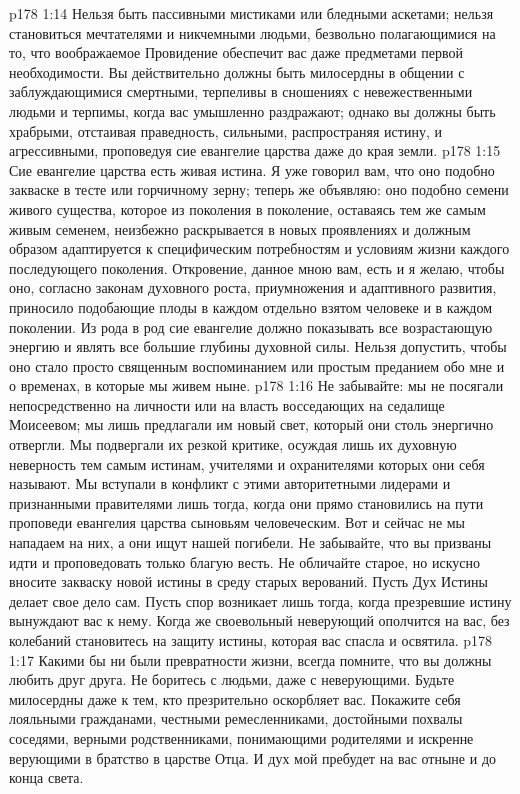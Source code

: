 \vs p178 1:14 Нельзя быть пассивными мистиками или бледными аскетами; нельзя становиться мечтателями и никчемными людьми, безвольно полагающимися на то, что воображаемое Провидение обеспечит вас даже предметами первой необходимости. Вы действительно должны быть милосердны в общении с заблуждающимися смертными, терпеливы в сношениях с невежественными людьми и терпимы, когда вас умышленно раздражают; однако вы должны быть храбрыми, отстаивая праведность, сильными, распространяя истину, и агрессивными, проповедуя сие евангелие царства даже до края земли.
\vs p178 1:15 Сие евангелие царства есть живая истина. Я уже говорил вам, что оно подобно закваске в тесте или горчичному зерну; теперь же объявляю: оно подобно семени живого существа, которое из поколения в поколение, оставаясь тем же самым живым семенем, неизбежно раскрывается в новых проявлениях и должным образом адаптируется к специфическим потребностям и условиям жизни каждого последующего поколения. Откровение, данное мною вам, есть  и я желаю, чтобы оно, согласно законам духовного роста, приумножения и адаптивного развития, приносило подобающие плоды в каждом отдельно взятом человеке и в каждом поколении. Из рода в род сие евангелие должно показывать все возрастающую энергию и являть все большие глубины духовной силы. Нельзя допустить, чтобы оно стало просто священным воспоминанием или простым преданием обо мне и о временах, в которые мы живем ныне.
\vs p178 1:16 Не забывайте: мы не посягали непосредственно на личности или на власть восседающих на седалище Моисеевом; мы лишь предлагали им новый свет, который они столь энергично отвергли. Мы подвергали их резкой критике, осуждая лишь их духовную неверность тем самым истинам, учителями и охранителями которых они себя называют. Мы вступали в конфликт с этими авторитетными лидерами и признанными правителями лишь тогда, когда они прямо становились на пути проповеди евангелия царства сыновьям человеческим. Вот и сейчас не мы нападаем на них, а они ищут нашей погибели. Не забывайте, что вы призваны идти и проповедовать только благую весть. Не обличайте старое, но искусно вносите закваску новой истины в среду старых верований. Пусть Дух Истины делает свое дело сам. Пусть спор возникает лишь тогда, когда презревшие истину вынуждают вас к нему. Когда же своевольный неверующий ополчится на вас, без колебаний становитесь на защиту истины, которая вас спасла и освятила.
\vs p178 1:17 Какими бы ни были превратности жизни, всегда помните, что вы должны любить друг друга. Не боритесь с людьми, даже с неверующими. Будьте милосердны даже к тем, кто презрительно оскорбляет вас. Покажите себя лояльными гражданами, честными ремесленниками, достойными похвалы соседями, верными родственниками, понимающими родителями и искренне верующими в братство в царстве Отца. И дух мой пребудет на вас отныне и до конца света.
